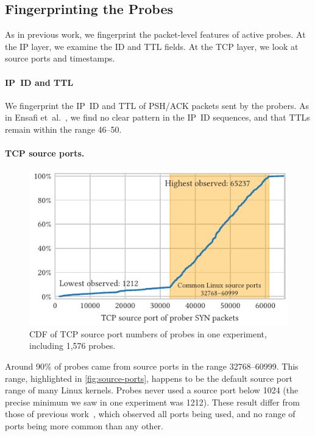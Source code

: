 \documentclass[sigconf,letterpaper]{acmart}
\begin{document}
\subsection{Fingerprinting the Probes}
\label{sec:fingerprinting}

As in previous work, we fingerprint the packet-level features
of active probes.
At the IP layer, we examine the ID and TTL fields.
At the TCP layer, we look at source ports and timestamps.

\paragraph{IP~ID and TTL}
We fingerprint the IP~ID and TTL of PSH/\hspace{0pt}ACK packets sent by the probers.
As in Ensafi et~al.~\cite[\S 5.5]{Ensafi2015b},
we find no clear pattern in the IP~ID sequences,
and that TTLs remain within the range 46--50.

\paragraph{TCP source ports.}

\begin{figure}
    \includegraphics{figures/cdf_source_port_lon15.pdf}
    \caption{
    CDF of TCP source port numbers of probes in one experiment, including 1,576 probes.
    }
    \label{fig:source-ports}
\end{figure}

Around 90\% of probes came from source ports in the range 32768--60999.
This range, highlighted in \autoref{fig:source-ports},
happens to be the default source port range of many Linux kernels.
Probes never used a source port below 1024 (the precise minimum we saw in one experiment was 1212).
These result differ from those of previous work~\cite[\S 5.5]{Ensafi2015b},
which observed all ports being used, and no range of ports being more common than any other.
\end{document}

